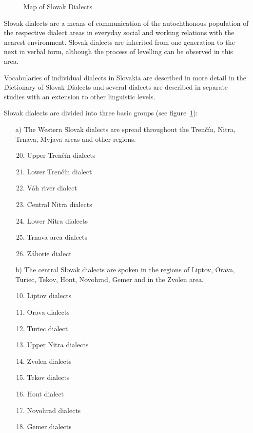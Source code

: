 \begin{multicols}{2}
\begin{figure}[ht]
\centering
\def\svgwidth{\textwidth}

\caption{%
Map of Slovak Dialects
}
\label{fig:dialects_en}
\end{figure}

Slovak dialects are a means of communication of the autochthonous population of the respective dialect areas in everyday social and working relations with the nearest environment. Slovak dialects are inherited from one generation to the next in verbal form, although the process of levelling can be observed in this area. 

Vocabularies of individual dialects in Slovakia are described in more detail in the Dictionary of Slovak Dialects and several dialects are described in separate studies with an extension to other linguistic levels.

Slovak dialects are divided into three basic groups (see figure~\ref{fig:dialects_en}):

\begin{itemize}

\item[a)] The Western Slovak dialects are spread throughout the Trenčín, Nitra, Trnava, Myjava areas and other regions.

\begin{enumerate}
\setcounter{enumi}{19}
\item Upper Trenčín dialects
\item Lower Trenčín dialect
\item Váh river dialect
\item Central Nitra dialects
\item Lower Nitra dialects
\item Trnava area dialects
\item Záhorie dialect
\end{enumerate}

\item[b)] The central Slovak dialects are spoken in the regions of Liptov, Orava, Turiec, Tekov, Hont, Novohrad, Gemer and in the Zvolen area.

\begin{enumerate}
\setcounter{enumi}{9}
\item Liptov dialects
\item Orava dialects
\item Turiec dialect
\item Upper Nitra dialects
\item Zvolen dialects
\item Tekov dialects
\item Hont dialect
\item Novohrad dialects
\item Gemer dialects
\end{enumerate}


\end{itemize}
\end{multicols}
